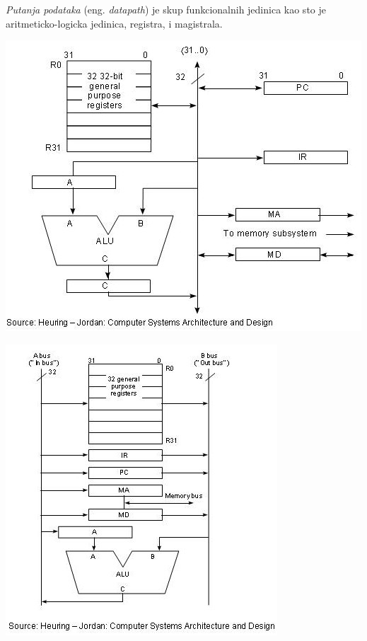 \documentclass[12p,a4paper]{article}
\begin{document}
\begin{multicols}{2}
    \emph{Putanja podataka} (eng. \emph{datapath}) je skup funkcionalnih 
    jedinica kao sto je aritmeticko-logicka jedinica, registra, i magistrala.

    \includegraphics[width=\columnwidth]{Figures/1bus_datapath.jpg}

    \includegraphics[width=\columnwidth]{Figures/2bus_datapath.jpg}


\end{multicols}
\end{document}
